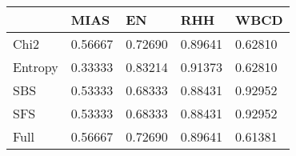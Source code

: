 \begin{tabular}{|l|l|l|l|l|}
\toprule
{} &    MIAS &      EN &     RHH &    WBCD \\
\midrule
Chi2    & 0.56667 & 0.72690 & 0.89641 & 0.62810 \\
Entropy & 0.33333 & 0.83214 & 0.91373 & 0.62810 \\
SBS     & 0.53333 & 0.68333 & 0.88431 & 0.92952 \\
SFS     & 0.53333 & 0.68333 & 0.88431 & 0.92952 \\
Full    & 0.56667 & 0.72690 & 0.89641 & 0.61381 \\
\bottomrule
\end{tabular}
